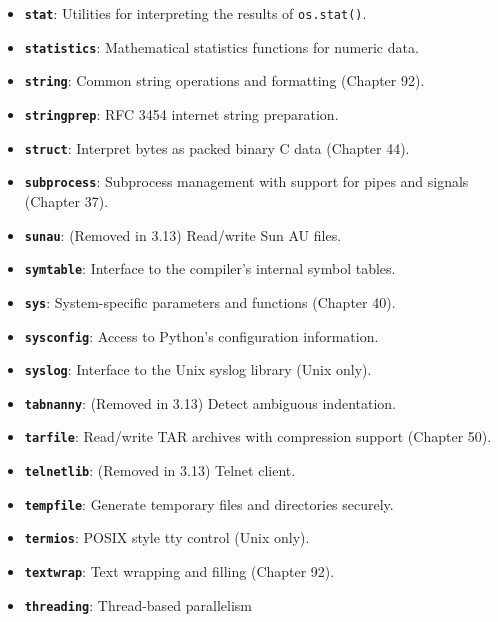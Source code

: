 \begin{itemize}
  objects using OpenSSL (Chapter 38).
\item
  \textbf{\passthrough{\lstinline!stat!}}: Utilities for interpreting
  the results of \passthrough{\lstinline!os.stat()!}.
\item
  \textbf{\passthrough{\lstinline!statistics!}}: Mathematical statistics
  functions for numeric data.
\item
  \textbf{\passthrough{\lstinline!string!}}: Common string operations
  and formatting (Chapter 92).
\item
  \textbf{\passthrough{\lstinline!stringprep!}}: RFC 3454 internet
  string preparation.
\item
  \textbf{\passthrough{\lstinline!struct!}}: Interpret bytes as packed
  binary C data (Chapter 44).
\item
  \textbf{\passthrough{\lstinline!subprocess!}}: Subprocess management
  with support for pipes and signals (Chapter 37).
\item
  \textbf{\passthrough{\lstinline!sunau!}}: (Removed in 3.13) Read/write
  Sun AU files.
\item
  \textbf{\passthrough{\lstinline!symtable!}}: Interface to the
  compiler's internal symbol tables.
\item
  \textbf{\passthrough{\lstinline!sys!}}: System-specific parameters and
  functions (Chapter 40).
\item
  \textbf{\passthrough{\lstinline!sysconfig!}}: Access to Python's
  configuration information.
\item
  \textbf{\passthrough{\lstinline!syslog!}}: Interface to the Unix
  syslog library (Unix only).
\item
  \textbf{\passthrough{\lstinline!tabnanny!}}: (Removed in 3.13) Detect
  ambiguous indentation.
\item
  \textbf{\passthrough{\lstinline!tarfile!}}: Read/write TAR archives
  with compression support (Chapter 50).
\item
  \textbf{\passthrough{\lstinline!telnetlib!}}: (Removed in 3.13) Telnet
  client.
\item
  \textbf{\passthrough{\lstinline!tempfile!}}: Generate temporary files
  and directories securely.
\item
  \textbf{\passthrough{\lstinline!termios!}}: POSIX style tty control
  (Unix only).
\item
  \textbf{\passthrough{\lstinline!textwrap!}}: Text wrapping and filling
  (Chapter 92).
\item
  \textbf{\passthrough{\lstinline!threading!}}: Thread-based parallelism

\end{itemize}

